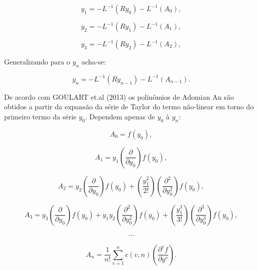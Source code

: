  \begin{equation}
 y_{1} = -L^{-1} (Ry_{0}) - L^{-1}(A_{0}), \end{equation}
 
 \begin{equation}y_{2} = -L^{-1} (Ry_{1}) - L^{-1}(A_{1}),\end{equation}
 
 \begin{equation}y_{3} = -L^{-1} (Ry_{2}) - L^{-1}(A_{2}),
 \end{equation}
 
 Generalizando para o $y_{n}$ acha-se:
 
 \begin{equation}y_{n} = -L^{-1} (Ry_{n-1}) - L^{-1}(A_{n-1}).
 \end{equation}
 
  De acordo com GOULART et.al (2013) os polinômios de Adomian An são obtidos a partir da expansão da série de Taylor do termo não-linear em torno do primeiro termo da série $y_{0}$. Dependem apenas de $y_{0}$ à $y_{n}$:
  
  \begin{equation}
  A_{0} = f(y_{0}),
  \end{equation}
  
   \begin{equation}
  A_{1} = y_{1}\left(\dfrac{\partial }{\partial y_{0}}\right) f(y_{0}),
  \end{equation}
  
  \begin{equation}
  A_{2} = y_{2} \left(\dfrac{\partial }{\partial y_{0}}\right)f(y_{0}) +\left(\dfrac{y_{1}^2}{2!}\right)\left(\dfrac{\partial^2 }{\partial y_{0}^2}\right)f(y_{0}),
  \end{equation}
 
   \begin{equation}
  A_{3} = y_{3} \left(\dfrac{\partial }{\partial y_{0}}\right)f(y_{0}) + y_{1}y_{2}\left(\dfrac{\partial^2 }{\partial y_{0}^2}\right)f(y_{0}) + \left(\dfrac{y_{1}^3}{3!}\right)\left(\dfrac{\partial^3 }{\partial y_{0}^3}\right)f(y_{0}),
  \end{equation}
  
 \begin{gather*}
 ...
 \end{gather*}
 
 \begin{equation}
  A_{n} = \dfrac{1}{n!} \sum_{v=1}^{n} c(v,n)\left(\dfrac{\partial^vf }{\partial y^v}\right).
 \end{equation}
  
